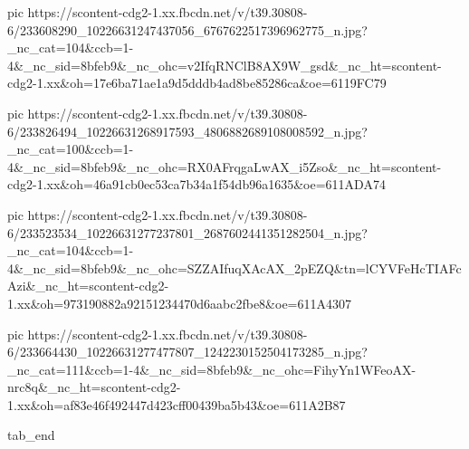      pic https://scontent-cdg2-1.xx.fbcdn.net/v/t39.30808-6/233608290_10226631247437056_6767622517396962775_n.jpg?_nc_cat=104&ccb=1-4&_nc_sid=8bfeb9&_nc_ohc=v2IfqRNClB8AX9W_gsd&_nc_ht=scontent-cdg2-1.xx&oh=17e6ba71ae1a9d5dddb4ad8be85286ca&oe=6119FC79

     pic https://scontent-cdg2-1.xx.fbcdn.net/v/t39.30808-6/233826494_10226631268917593_4806882689108008592_n.jpg?_nc_cat=100&ccb=1-4&_nc_sid=8bfeb9&_nc_ohc=RX0AFrqgaLwAX_i5Zso&_nc_ht=scontent-cdg2-1.xx&oh=46a91cb0ec53ca7b34a1f54db96a1635&oe=611ADA74

     pic https://scontent-cdg2-1.xx.fbcdn.net/v/t39.30808-6/233523534_10226631277237801_2687602441351282504_n.jpg?_nc_cat=104&ccb=1-4&_nc_sid=8bfeb9&_nc_ohc=SZZAIfuqXAcAX_2pEZQ&tn=lCYVFeHcTIAFcAzi&_nc_ht=scontent-cdg2-1.xx&oh=973190882a92151234470d6aabc2fbe8&oe=611A4307

     pic https://scontent-cdg2-1.xx.fbcdn.net/v/t39.30808-6/233664430_10226631277477807_1242230152504173285_n.jpg?_nc_cat=111&ccb=1-4&_nc_sid=8bfeb9&_nc_ohc=FihyYn1WFeoAX-nrc8q&_nc_ht=scontent-cdg2-1.xx&oh=af83e46f492447d423cff00439ba5b43&oe=611A2B87

  tab_end
\fi

